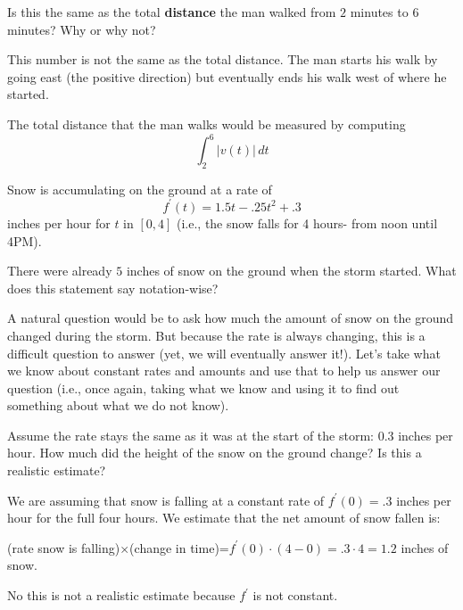 \documentclass[handout, nooutcomes]{ximera}
\renewenvironment{freeResponse}{
\ifhandout\setbox0\vbox\bgroup\else
\begin{trivlist}\item[\hskip \labelsep\bfseries Solution:\hspace{2ex}]
\fi}
{\ifhandout\egroup\else
\end{trivlist}
\fi}
\renewcommand{\d}{\,d}
\newcommand{\dfn}{\textbf}
\begin{document}
\begin{problem}
\begin{enumerate}
  \item  Is this the same as the total \dfn{distance} the man walked from $2$ minutes to $6$ minutes?
    Why or why not?
    \begin{freeResponse}
      This number is not the same as the total distance.
      The man starts his walk by going east (the positive direction) but eventually ends his walk west of where he started.
      
      The total distance that the man walks would be measured by computing 
      $$\int_2^6 \left| v(t) \right| \d t$$  
    \end{freeResponse}
  \end{enumerate}
\end{problem}

\begin{problem}
  Snow is accumulating on the ground at a rate of  
  $$f^\prime (t)=1.5t-.25 t^2+.3$$
  inches per hour for $t$ in $[0,4]$ (i.e., the snow falls for 4 hours- from noon until 4PM).  

  There were already $5$ inches of snow on the ground when the storm started.  What does this statement say notation-wise?

  A natural question would be to ask how much the amount of snow on the ground changed during the storm.  But because the rate is always changing, this is a difficult question to answer (yet, we will eventually answer it!).  Let’s take what we know about constant rates and amounts and use that to help us answer our question (i.e., once again, taking what we know and using it to find out something about what we do not know).

  \begin{enumerate}
    

  \item  Assume the rate stays the same as it was at the start of the storm: 0.3 inches per hour.  How much did the height of the snow on the ground change?  Is this a realistic estimate?
    \begin{freeResponse}
      We are assuming that snow is falling at a constant rate of $f^\prime (0)=.3$ inches per hour for the full four hours.  We estimate that the net amount of snow fallen is:
      
      (rate snow is falling)$\times$(change in time)=$f^\prime (0) \cdot (4-0) =.3 \cdot 4=1.2$ inches of snow.  
      
      No this is not a realistic estimate because $f^\prime$ is not constant.
    \end{freeResponse}


\end{enumerate}
\end{problem}
\end{document}
